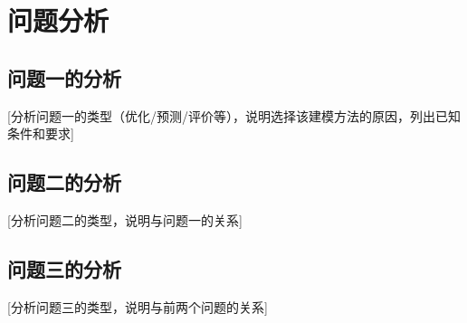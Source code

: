 
\section{问题分析}

\subsection{问题一的分析}

[分析问题一的类型（优化/预测/评价等），说明选择该建模方法的原因，列出已知条件和要求]

\subsection{问题二的分析}

[分析问题二的类型，说明与问题一的关系]

\subsection{问题三的分析}

[分析问题三的类型，说明与前两个问题的关系]

